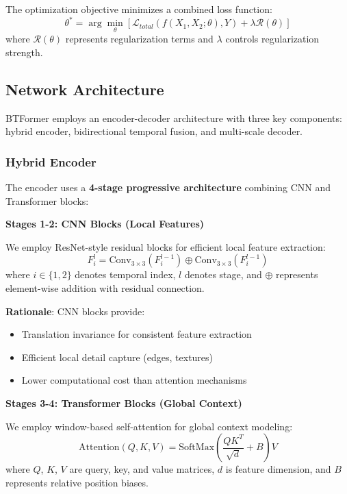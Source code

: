 \documentclass[journal]{IEEEtran}
\begin{document}
The optimization objective minimizes a combined loss function:
\begin{equation}
\theta^* = \arg\min_\theta \left[ \mathcal{L}_{total}(f(X_1, X_2; \theta), Y) + \lambda \mathcal{R}(\theta) \right]
\end{equation}
where $\mathcal{R}(\theta)$ represents regularization terms and $\lambda$ controls regularization strength.

\subsection{Network Architecture}

BTFormer employs an encoder-decoder architecture with three key components: hybrid encoder, bidirectional temporal fusion, and multi-scale decoder.

\subsubsection{Hybrid Encoder}

The encoder uses a \textbf{4-stage progressive architecture} combining CNN and Transformer blocks:

\textbf{Stages 1-2: CNN Blocks (Local Features)}

We employ ResNet-style residual blocks for efficient local feature extraction:
\begin{equation}
F_i^l = \text{Conv}_{3 \times 3}(F_i^{l-1}) \oplus \text{Conv}_{3 \times 3}(F_i^{l-1})
\end{equation}
where $i \in \{1,2\}$ denotes temporal index, $l$ denotes stage, and $\oplus$ represents element-wise addition with residual connection.

\textbf{Rationale}: CNN blocks provide:
\begin{itemize}
    \item Translation invariance for consistent feature extraction
    \item Efficient local detail capture (edges, textures)
    \item Lower computational cost than attention mechanisms
\end{itemize}

\textbf{Stages 3-4: Transformer Blocks (Global Context)}

We employ window-based self-attention for global context modeling:
\begin{equation}
\text{Attention}(Q, K, V) = \text{SoftMax}\left(\frac{QK^T}{\sqrt{d}} + B\right)V
\end{equation}
where $Q$, $K$, $V$ are query, key, and value matrices, $d$ is feature dimension, and $B$ represents relative position biases.
\end{document}
